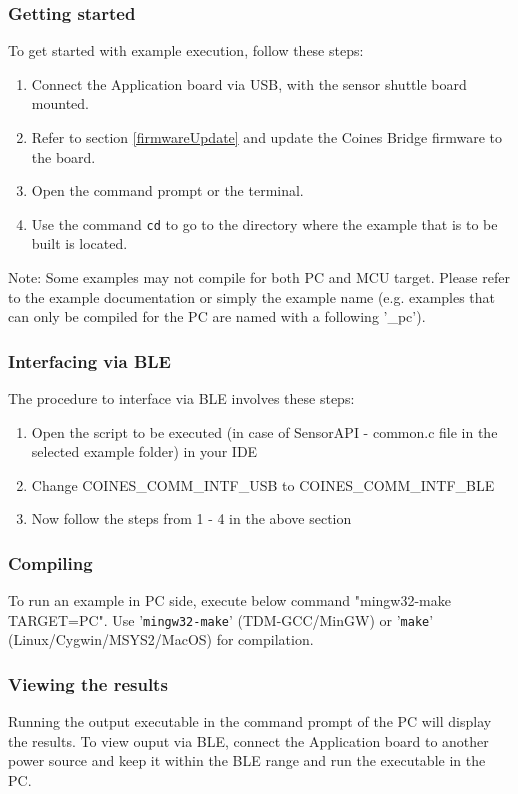 \documentclass{article}
\begin{document}
\subsubsection{Getting started}
To get started with example execution, follow these steps:
\begin{enumerate}
\item Connect the Application board via USB, with the sensor shuttle board mounted.
\item Refer to section \ref{firmwareUpdate} and update the Coines Bridge firmware to the board.
\item Open the command prompt or the terminal.
\item Use the command \texttt{cd} to go to the directory where the example that is to be built is located.
\end{enumerate}
Note: Some examples may not compile for both PC and MCU target. Please refer to the example documentation or simply the example name (e.g. examples that can only be compiled for the PC are named with a following '\_pc').

\subsubsection{Interfacing via BLE}
The procedure to interface via BLE involves these steps:
\begin{enumerate}
	\item Open the script to be executed (in case of SensorAPI - common.c file in the selected example folder) in your IDE
	\item Change COINES\_COMM\_INTF\_USB  to COINES\_COMM\_INTF\_BLE
	\item Now follow the steps from 1 - 4 in the above section
\end{enumerate}

\subsubsection{Compiling}
To run an example in PC side, execute below command "mingw32-make TARGET=PC". Use '\texttt{mingw32-make}' (TDM-GCC/MinGW) or '\texttt{make}' (Linux/Cygwin/MSYS2/MacOS) for compilation.

\subsubsection{Viewing the results}
Running the output executable in the command prompt of the PC will display the results. To view ouput via BLE, connect the Application board to another power source and keep it within the BLE range and run the executable in the PC.
\end{document}
